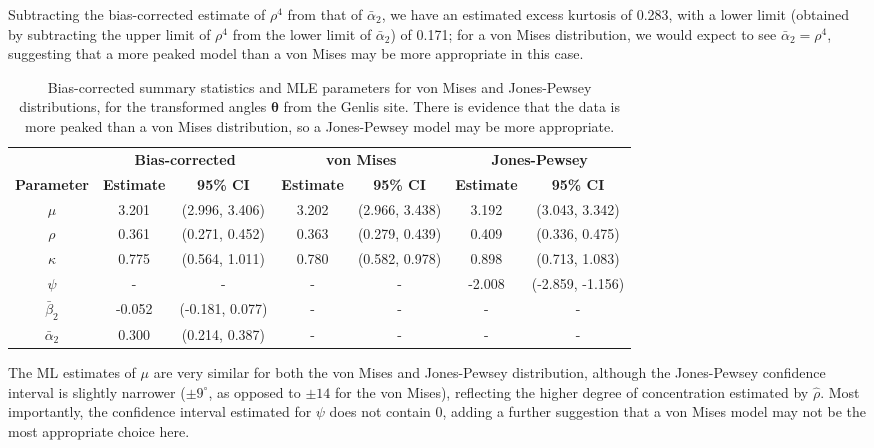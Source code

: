 \documentclass[../../ArchStats.tex]{subfiles}
\begin{document}
Subtracting the bias-corrected estimate of $\rho^4$ from that of $\bar{\alpha}_2$, we have an estimated excess kurtosis of 0.283, with a lower limit (obtained by subtracting the upper limit of $\rho^4$ from the lower limit of $\bar{\alpha}_2$) of 0.171; for a von Mises distribution, we would expect to see $\bar{\alpha}_2 = \rho^4$, suggesting that a more peaked model than a von Mises may be more appropriate in this case.

\begin{table}[!h]
\footnotesize
\centering
\caption{Bias-corrected summary statistics and MLE parameters for von Mises and Jones-Pewsey distributions, for the transformed angles $\boldsymbol{\theta}$ from the Genlis site. There is evidence that the data is more peaked than a von Mises distribution, so a Jones-Pewsey model may be more appropriate.}
\label{tab:Genlis-statistics}
\begin{tabular}{c|cc|cc|cc}
\hline 
 & \multicolumn{2}{c|}{\textbf{Bias-corrected}} & \multicolumn{2}{c|}{\textbf{von Mises}} & \multicolumn{2}{c}{\textbf{Jones-Pewsey}} \\
\textbf{Parameter} & \textbf{Estimate} & \textbf{95\% CI} & \textbf{Estimate} & \textbf{95\% CI} & \textbf{Estimate} & \textbf{95\% CI} \\
\hline
$\mu$ & 3.201 & (2.996, 3.406) & 3.202 & (2.966, 3.438) & 3.192 & (3.043, 3.342) \\ 
$\rho$ & 0.361 & (0.271, 0.452) & 0.363 & (0.279, 0.439) & 0.409 & (0.336, 0.475) \\ 
$\kappa$ & 0.775 & (0.564, 1.011) & 0.780 & (0.582, 0.978) & 0.898 & (0.713, 1.083) \\ 
$\psi$ & - & - & - & - & -2.008 & (-2.859, -1.156) \\ 
$\bar{\beta}_2$ & -0.052 & (-0.181, 0.077) & - & - & - & - \\ 
$\bar{\alpha}_2 $ & 0.300 & (0.214, 0.387) & - & - & - & - \\ 
\hline
\end{tabular}
\end{table}


The ML estimates of $\mu$ are very similar for both the von Mises and Jones-Pewsey distribution, although the Jones-Pewsey confidence interval is slightly narrower ($\pm 9^\circ$, as opposed to $\pm 14$ for the von Mises), reflecting the higher degree of concentration estimated by $\hat{\rho}$. Most importantly, the confidence interval estimated for $\psi$ does not contain 0, adding a further suggestion that a von Mises model may not be the most appropriate choice here.
\end{document}
